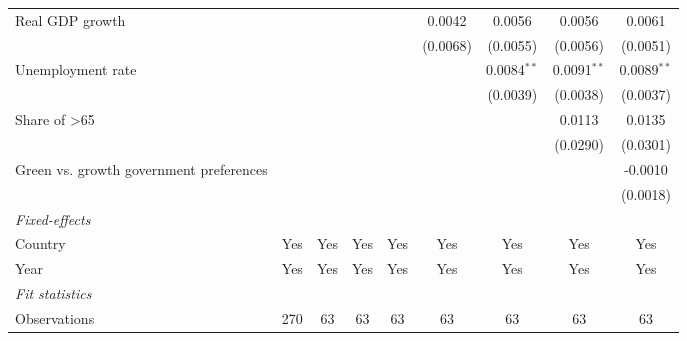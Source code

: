 \begin{table}[htbp]
\begin{tabular}{lcccccccc}
      Real GDP growth                                                                    &          &          &          &              & 0.0042        & 0.0056        & 0.0056        & 0.0061\\   
                                                                                         &          &          &          &              & (0.0068)      & (0.0055)      & (0.0056)      & (0.0051)\\   
      Unemployment rate                                                                  &          &          &          &              &               & 0.0084$^{**}$ & 0.0091$^{**}$ & 0.0089$^{**}$\\   
                                                                                         &          &          &          &              &               & (0.0039)      & (0.0038)      & (0.0037)\\   
      Share of >65                                                                       &          &          &          &              &               &               & 0.0113        & 0.0135\\   
                                                                                         &          &          &          &              &               &               & (0.0290)      & (0.0301)\\   
      Green vs. growth government preferences                                            &          &          &          &              &               &               &               & -0.0010\\   
                                                                                         &          &          &          &              &               &               &               & (0.0018)\\   
      \midrule
      \emph{Fixed-effects}\\
      Country                                                                            & Yes      & Yes      & Yes      & Yes          & Yes           & Yes           & Yes           & Yes\\  
      Year                                                                               & Yes      & Yes      & Yes      & Yes          & Yes           & Yes           & Yes           & Yes\\  
      \midrule
      \emph{Fit statistics}\\
      Observations                                                                       & 270      & 63       & 63       & 63           & 63            & 63            & 63            & 63\\  

\end{tabular}
\end{table}
